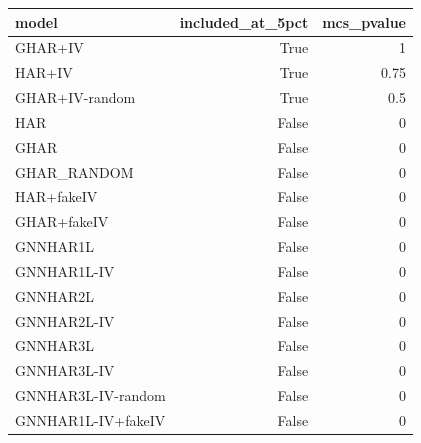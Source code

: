 \begin{tabular}{lrr}
\toprule
model & included_at_5pct & mcs_pvalue \\
\midrule
GHAR+IV & True & 1 \\
HAR+IV & True & 0.75 \\
GHAR+IV-random & True & 0.5 \\
HAR & False & 0 \\
GHAR & False & 0 \\
GHAR_RANDOM & False & 0 \\
HAR+fakeIV & False & 0 \\
GHAR+fakeIV & False & 0 \\
GNNHAR1L & False & 0 \\
GNNHAR1L-IV & False & 0 \\
GNNHAR2L & False & 0 \\
GNNHAR2L-IV & False & 0 \\
GNNHAR3L & False & 0 \\
GNNHAR3L-IV & False & 0 \\
GNNHAR3L-IV-random & False & 0 \\
GNNHAR1L-IV+fakeIV & False & 0 \\
\bottomrule
\end{tabular}
